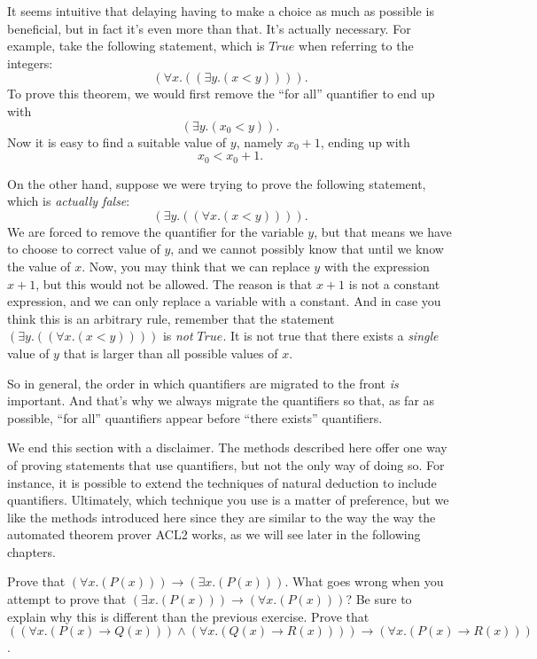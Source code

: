 It seems intuitive that delaying having to make a choice as much as possible is
beneficial, but in fact it's even more than that. It's actually necessary. For example,
take the following statement, which is $True$ when referring to the integers:
$$(\forall x.((\exists y.(x < y)))).$$
To prove this theorem, we would first remove the ``for all'' quantifier to end up with
$$(\exists y.(x_0 < y)).$$
Now it is easy to find a suitable value of $y$, namely $x_0+1$, ending up with
$$x_0 < x_0 + 1.$$

On the other hand, suppose we were trying to prove the following statement, which
is \emph{actually false}:
$$(\exists y.((\forall x.(x < y)))).$$
We are forced to remove the quantifier for the variable $y$, but that means we have
to choose to correct value of $y$, and we cannot possibly know that until we know
the value of $x$.
Now, you may think that we can replace $y$ with the expression $x+1$, but this would
not be allowed. The reason is that $x+1$ is not a constant expression, and we can
only replace a variable with a constant. And in case you think this is an arbitrary
rule, remember that the statement $(\exists y.((\forall x.(x < y))))$ is \emph{not}
$True$. It is not true that there exists a \emph{single} value of $y$ that is larger
than all possible values of $x$.

So in general, the order in which quantifiers are migrated to the front \emph{is} 
important. And that's why we always migrate the quantifiers so that, as far as
possible, ``for all'' quantifiers appear before ``there exists'' quantifiers.

We end this section with a disclaimer. The methods described here offer one way of
proving statements that use quantifiers, but not the only way of doing so. For
instance, it is possible to extend the techniques of natural deduction to include
quantifiers. Ultimately, which technique you use is a matter of preference, but
we like the methods introduced here since they are similar to the way the way the
automated theorem prover ACL2 works, as we will see later in the following chapters.

\begin{ExerciseList}
\Exercise Prove that $(\forall x.(P(x))) \rightarrow (\exists x.(P(x)))$.
\Exercise What goes wrong when you attempt to prove that $(\exists x.(P(x))) \rightarrow (\forall x.(P(x)))$? Be sure to explain
    why this is different than the previous exercise.
\Exercise Prove that $((\forall x.(P(x) \rightarrow Q(x))) \wedge (\forall x.(Q(x) \rightarrow R(x)))) \rightarrow (\forall x.(P(x) \rightarrow R(x)))$.
\end{ExerciseList}
